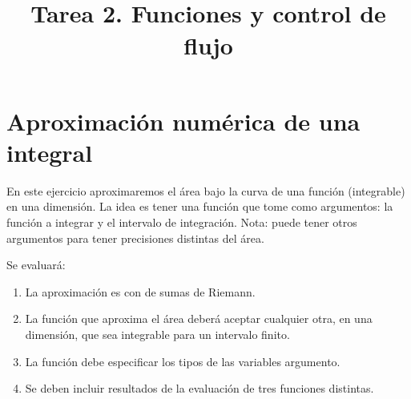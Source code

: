 \documentclass[letterpaper,8pt]{article}
\title{\vspace{-2.5cm}{\bf Programación en Julia: Primeros pasos}\\
\vspace{1cm}
Tarea 2. Funciones y control de flujo}
\date{}
\begin{document}
\maketitle
\thispagestyle{empty}
\section*{Aproximación numérica de una integral}
En este ejercicio aproximaremos el área bajo la curva de una función
(integrable) en una dimensión. La idea es tener una función que tome
como argumentos: la función a integrar y el intervalo de
integración. Nota: puede tener otros argumentos para tener precisiones
distintas del área.

Se evaluará:
\begin{enumerate}
\item La aproximación es con de sumas de Riemann.
\item La función que aproxima el área deberá aceptar cualquier otra,
  en una dimensión, que sea integrable para un intervalo finito.
\item La función debe especificar los tipos de las variables argumento.
\item Se deben incluir resultados de la evaluación de tres funciones
  distintas.
\end{enumerate}

\end{document}
